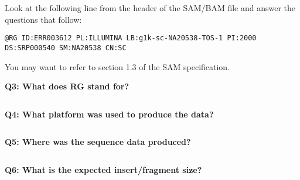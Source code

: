 \documentclass[11pt]{article}
\makeatletter
\newcommand{\boxspacing}{\kern\kvtcb@left@rule\kern\kvtcb@boxsep}
\newcommand{\prompt}[4]{
        {\ttfamily\llap{{\color{blue}\LARGE\faKeyboardO\hspace{3pt}#4}}\vspace{-\baselineskip}}
    }
\makeatother
\begin{document}
Look at the following line from the header of the SAM/BAM file and
answer the questions that follow:

\begin{verbatim}
@RG ID:ERR003612 PL:ILLUMINA LB:g1k-sc-NA20538-TOS-1 PI:2000 DS:SRP000540 SM:NA20538 CN:SC
\end{verbatim}

You may want to refer to section 1.3 of the SAM specification.

\textbf{Q3: What does RG stand for?}

    \begin{tcolorbox}[breakable, size=fbox, boxrule=1pt, pad at break*=1mm,colback=cellbackground, colframe=cellborder]
\prompt{In}{incolor}{ }{\boxspacing}
\begin{Verbatim}[commandchars=\\\{\}]

\end{Verbatim}
\end{tcolorbox}

    \textbf{Q4: What platform was used to produce the data?}

    \begin{tcolorbox}[breakable, size=fbox, boxrule=1pt, pad at break*=1mm,colback=cellbackground, colframe=cellborder]
\prompt{In}{incolor}{ }{\boxspacing}
\begin{Verbatim}[commandchars=\\\{\}]

\end{Verbatim}
\end{tcolorbox}

    \textbf{Q5: Where was the sequence data produced?}

    \begin{tcolorbox}[breakable, size=fbox, boxrule=1pt, pad at break*=1mm,colback=cellbackground, colframe=cellborder]
\prompt{In}{incolor}{ }{\boxspacing}
\begin{Verbatim}[commandchars=\\\{\}]

\end{Verbatim}
\end{tcolorbox}

    \textbf{Q6: What is the expected insert/fragment size?}

    \begin{tcolorbox}[breakable, size=fbox, boxrule=1pt, pad at break*=1mm,colback=cellbackground, colframe=cellborder]
\prompt{In}{incolor}{ }{\boxspacing}
\begin{Verbatim}[commandchars=\\\{\}]

\end{Verbatim}
\end{tcolorbox}
\end{document}
